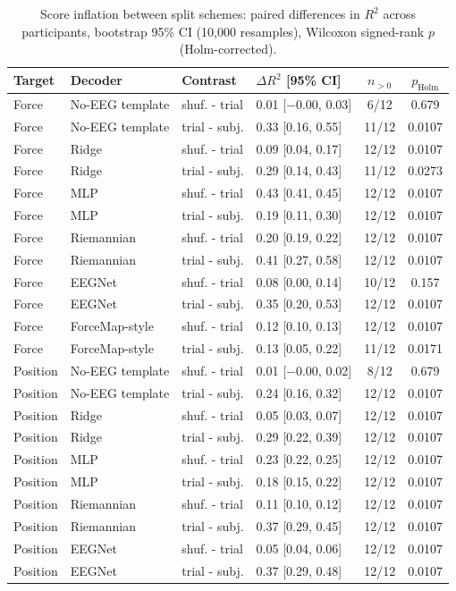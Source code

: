 \begin{table}[t]
\centering
\caption{Score inflation between split schemes: paired differences in $R^2$ across participants, bootstrap 95\% CI (10,000 resamples), Wilcoxon signed-rank $p$ (Holm-corrected).}
\label{tab:inflation}
\footnotesize
\setlength{\tabcolsep}{3pt}
\begin{tabular}{llllcc}
\toprule
Target & Decoder & Contrast & $\Delta R^2$ [95\% CI] & $n_{>0}$ & $p_\text{Holm}$ \\
\midrule
Force & No-EEG template & shuf. - trial & 0.01 [$-$0.00, 0.03] & 6/12 & 0.679 \\
Force & No-EEG template & trial - subj. & 0.33 [0.16, 0.55] & 11/12 & 0.0107 \\
Force & Ridge & shuf. - trial & 0.09 [0.04, 0.17] & 12/12 & 0.0107 \\
Force & Ridge & trial - subj. & 0.29 [0.14, 0.43] & 11/12 & 0.0273 \\
Force & MLP & shuf. - trial & 0.43 [0.41, 0.45] & 12/12 & 0.0107 \\
Force & MLP & trial - subj. & 0.19 [0.11, 0.30] & 12/12 & 0.0107 \\
Force & Riemannian & shuf. - trial & 0.20 [0.19, 0.22] & 12/12 & 0.0107 \\
Force & Riemannian & trial - subj. & 0.41 [0.27, 0.58] & 12/12 & 0.0107 \\
Force & EEGNet & shuf. - trial & 0.08 [0.00, 0.14] & 10/12 & 0.157 \\
Force & EEGNet & trial - subj. & 0.35 [0.20, 0.53] & 12/12 & 0.0107 \\
Force & ForceMap-style & shuf. - trial & 0.12 [0.10, 0.13] & 12/12 & 0.0107 \\
Force & ForceMap-style & trial - subj. & 0.13 [0.05, 0.22] & 11/12 & 0.0171 \\
Position & No-EEG template & shuf. - trial & 0.01 [$-$0.00, 0.02] & 8/12 & 0.679 \\
Position & No-EEG template & trial - subj. & 0.24 [0.16, 0.32] & 12/12 & 0.0107 \\
Position & Ridge & shuf. - trial & 0.05 [0.03, 0.07] & 12/12 & 0.0107 \\
Position & Ridge & trial - subj. & 0.29 [0.22, 0.39] & 12/12 & 0.0107 \\
Position & MLP & shuf. - trial & 0.23 [0.22, 0.25] & 12/12 & 0.0107 \\
Position & MLP & trial - subj. & 0.18 [0.15, 0.22] & 12/12 & 0.0107 \\
Position & Riemannian & shuf. - trial & 0.11 [0.10, 0.12] & 12/12 & 0.0107 \\
Position & Riemannian & trial - subj. & 0.37 [0.29, 0.45] & 12/12 & 0.0107 \\
Position & EEGNet & shuf. - trial & 0.05 [0.04, 0.06] & 12/12 & 0.0107 \\
Position & EEGNet & trial - subj. & 0.37 [0.29, 0.48] & 12/12 & 0.0107 \\
\bottomrule
\end{tabular}
\end{table}
